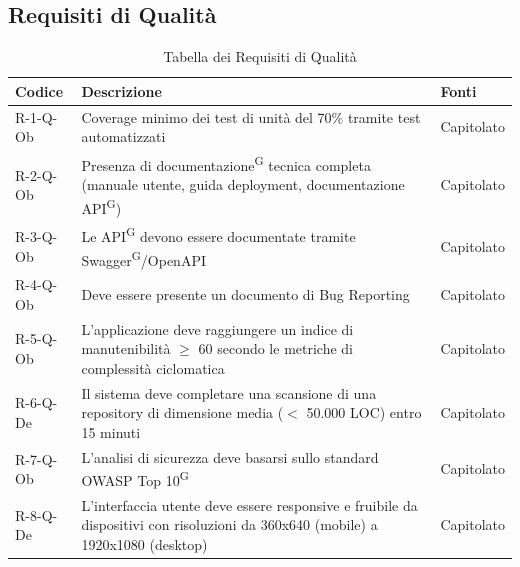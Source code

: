 \documentclass[a4paper, 11pt]{article}
\renewcommand{\arraystretch}{1.4} %
\begin{document}
\subsection{Requisiti di Qualità}
\renewcommand{\arraystretch}{1.5}
\begin{longtable}[c]{ >{\centering\arraybackslash}m{2.5cm} >{\centering\arraybackslash}m{8.3cm} >{\centering\arraybackslash}m{3.5cm} }
    \caption{Tabella dei Requisiti di Qualità} \\
    \rowcolor{AccentDark}
    \color{white}\textbf{Codice} & \color{white}\textbf{Descrizione} & \color{white}\textbf{Fonti} \\
    \endhead
    R-1-Q-Ob & Coverage minimo dei test di unità del 70\% tramite test automatizzati & Capitolato \\
    R-2-Q-Ob & Presenza di documentazione\textsuperscript{G} tecnica completa (manuale utente, guida deployment, documentazione API\textsuperscript{G}) & Capitolato \\
    R-3-Q-Ob & Le API\textsuperscript{G} devono essere documentate tramite Swagger\textsuperscript{G}/OpenAPI & Capitolato \\
    R-4-Q-Ob & Deve essere presente un documento di Bug Reporting & Capitolato \\
    R-5-Q-Ob & L'applicazione deve raggiungere un indice di manutenibilità $\geq$ 60 secondo le metriche di complessità ciclomatica & Capitolato \\
    R-6-Q-De & Il sistema deve completare una scansione di una repository di dimensione media ($<$ 50.000 LOC) entro 15 minuti & Capitolato \\
    R-7-Q-Ob & L'analisi di sicurezza deve basarsi sullo standard OWASP Top 10\textsuperscript{G} & Capitolato \\
    R-8-Q-De & L'interfaccia utente deve essere responsive e fruibile da dispositivi con risoluzioni da 360x640 (mobile) a 1920x1080 (desktop) & Capitolato \\
\end{longtable}
\end{document}

